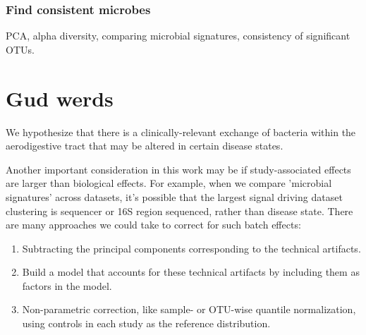 \documentclass[12pt]{article}
\begin{document}
\subsubsection{Find consistent microbes}
PCA, alpha diversity, comparing microbial signatures, consistency of significant OTUs.

\section{Gud werds}
We hypothesize that there is a clinically-relevant exchange of bacteria within the aerodigestive tract that may be altered in certain disease states. 


Another important consideration in this work may be if study-associated effects are larger than biological effects. For example, when we compare 'microbial signatures' across datasets, it's possible that the largest signal driving dataset clustering is sequencer or 16S region sequenced, rather than disease state. There are many approaches we could take to correct for such batch effects:
\begin{enumerate}
	\item Subtracting the principal components corresponding to the technical artifacts.
	\item Build a model that accounts for these technical artifacts by including them as factors in the model.
	\item Non-parametric correction, like sample- or OTU-wise quantile normalization, using controls in each study as the reference distribution.
\end{enumerate}



\end{document}
